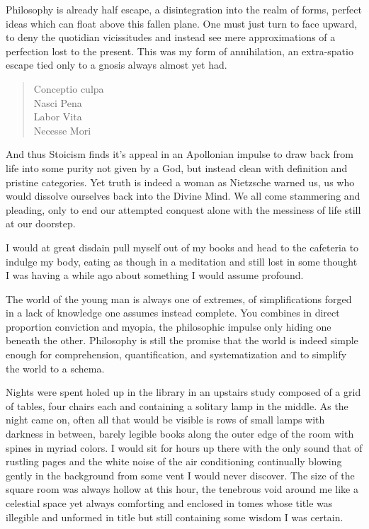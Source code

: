 \documentclass[ebook, 10pt, openright, onecolumn]{memoir}
\newenvironment{poetry}
{
  \begin{quote}
    \begin{itshape}
      \small
    }
    {
    \end{itshape}
  \end{quote}
}
\begin{document}
Philosophy is already half escape, a disintegration into the realm of forms,
perfect ideas which can float above this fallen plane.  One must just turn to
face upward, to deny the quotidian vicissitudes and instead see mere
approximations of a perfection lost to the present.  This was my form of
annihilation, an extra-spatio escape tied only to a gnosis always almost yet
had.
\begin{poetry}
  Conceptio culpa\\
  Nasci Pena\\
  Labor Vita\\
  Necesse Mori
\end{poetry}
And thus Stoicism finds it's appeal in an Apollonian impulse to draw back from
life into some purity not given by a God, but instead clean with definition and
pristine categories.  Yet truth is indeed a woman as Nietzsche warned us, us who
would dissolve ourselves back into the Divine Mind.  We all come stammering and
pleading, only to end our attempted conquest alone with the messiness of life
still at our doorstep.

I would at great disdain pull myself out of my books and head to the cafeteria
to indulge my body, eating as though in a meditation and still lost in some
thought I was having a while ago about something I would assume profound.

The world of the young man is always one of extremes, of simplifications forged
in a lack of knowledge one assumes instead complete.  You combines in direct
proportion conviction and myopia, the philosophic impulse only hiding one
beneath the other.  Philosophy is still the promise that the world is indeed
simple enough for comprehension, quantification, and systematization and to
simplify the world to a schema.

Nights were spent holed up in the library in an upstairs study composed of a
grid of tables, four chairs each and containing a solitary lamp in the middle.
As the night came on, often all that would be visible is rows of small lamps
with darkness in between, barely legible books along the outer edge of the room
with  spines in myriad colors.  I would sit for hours up there with the
only sound that of rustling pages and the white noise of the air conditioning
continually blowing gently in the background from some vent I would never
discover.  The size of the square room was always hollow at this hour, the
tenebrous void around me like a celestial space yet always comforting and
enclosed in tomes whose title was illegible and unformed in title but still
containing some wisdom I was certain.
\end{document}
